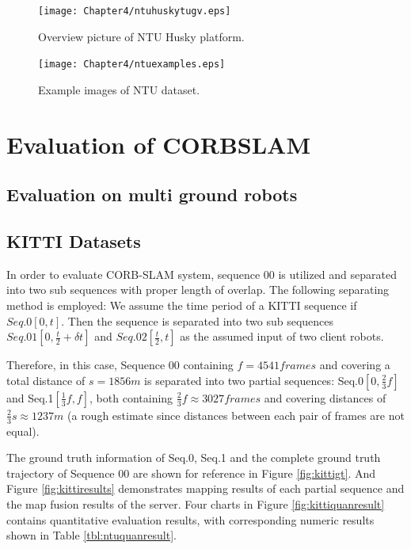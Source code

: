 \begin{figure}[H]
	\centering
	\texttt{[image: Chapter4/ntuhuskytugv.eps]}
	\caption{Overview picture of NTU Husky platform.}
	\label{fig:ntuugvplatform} 
\end{figure}


\begin{figure}[H]
	\centering
	\texttt{[image: Chapter4/ntuexamples.eps]}
	\caption{Example images of NTU dataset.}
	\label{fig:ntuexamples} 
\end{figure}

\section{Evaluation of CORBSLAM}

\ifoutputscaleerror
\subsection{Evaluation on multi ground robots}
\fi

\subsection{KITTI Datasets}
\label{sec:kittievaluate}
In order to evaluate CORB-SLAM system, sequence 00 is utilized and separated into two sub sequences with proper length of overlap. The following separating method is employed: We assume the time period of a KITTI sequence if $Seq.0[0,t]$. Then the sequence is separated into two sub sequences $Seq.01[0,\frac{t}{2}+\delta{t}]$ and $Seq.02[\frac{t}{2},t]$ as the assumed input of two client robots. 

Therefore, in this case, Sequence 00 containing $f=4541frames$ and covering a total distance of $s=1856m$ is separated into two partial sequences: Seq.0$[0, \frac{2}{3}f]$ and Seq.1$[\frac{1}{3}f, f]$, both containing  $\frac{2}{3}f\approx{3027frames}$ and covering distances of $\frac{2}{3}s\approx{1237m}$ (a rough estimate since distances between each pair of frames are not equal). 

The ground truth information of Seq.0, Seq.1 and the complete ground truth trajectory of Sequence 00 are shown for reference in Figure \ref{fig:kittigt}. And Figure \ref{fig:kittiresults} demonstrates mapping results of each partial sequence and the map fusion results of the server. Four charts in Figure \ref{fig:kittiquanresult} contains quantitative evaluation results, with corresponding numeric results shown in Table \ref{tbl:ntuquanresult}.

